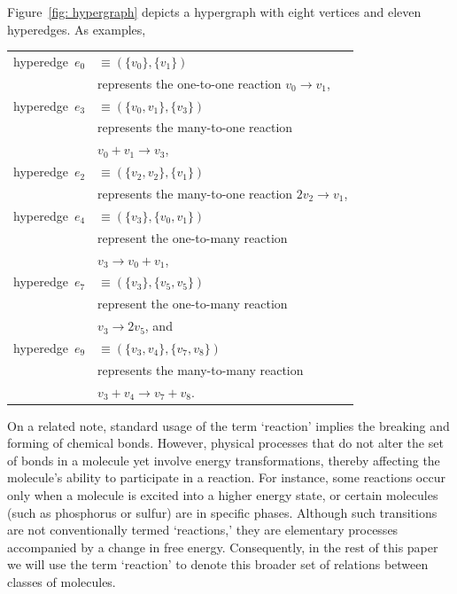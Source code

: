 \newpage

Figure~\ref{fig: hypergraph} depicts a hypergraph with eight vertices and eleven hyperedges.
As examples, \\
\begin{tabular}{ll}
	hyperedge~$e_0$ &$\equiv (\{v_0\}, \{v_1\})$ \\
	& represents the one-to-one reaction $v_0\rightarrow v_1$, \\
	hyperedge~$e_3$ &$\equiv (\{v_0, v_1\}, \{v_3\})$  \\
	& represents the many-to-one reaction \\
	& $v_0 + v_1\rightarrow v_3$, \\
	hyperedge~$e_2$ &$\equiv (\{v_2, v_2\}, \{v_1\})$ \\
	& represents the many-to-one reaction $2 v_2\rightarrow v_1$, \\
	hyperedge~$e_4$ &$\equiv (\{v_3\}, \{v_0, v_1\})$ \\
	& represent the one-to-many reaction \\
	& $v_3\rightarrow v_0 + v_1$, \\
	hyperedge~$e_7$ &$\equiv (\{v_3\}, \{v_5, v_5\})$ \\
	& represent the one-to-many reaction \\
	& $v_3\rightarrow 2 v_5$, and \\
	hyperedge~$e_9$ & $\equiv (\{v_3, v_4\}, \{v_7, v_8\})$ \\
	& represents the many-to-many reaction \\
	& $v_3 + v_4\rightarrow v_7 + v_8$.\\
\end{tabular}

On a related note, standard usage of the term `reaction' implies the breaking and forming of chemical bonds.
However, physical processes that do not alter the set of bonds in a molecule yet involve energy transformations, thereby affecting the molecule's ability to participate in a reaction.
For instance, some reactions occur only when a molecule is excited into a higher energy state, or certain molecules (such as phosphorus or sulfur) are in specific phases.
Although such transitions are not conventionally termed `reactions,' they are elementary processes accompanied by a change in free energy.
Consequently, in the rest of this paper we will use the term `reaction' to denote this broader set of relations between classes of molecules. 

